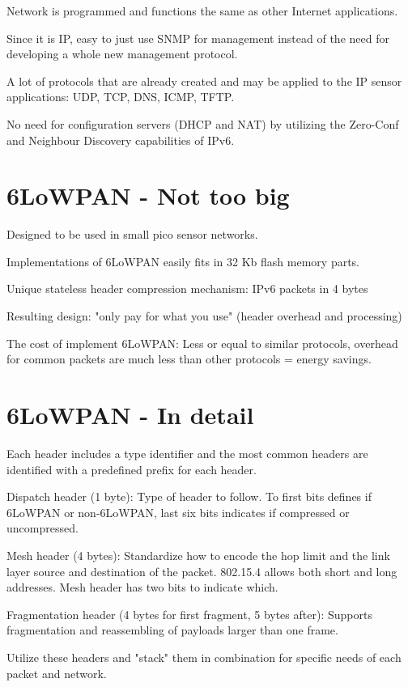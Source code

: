 \documentclass[10pt]{article}
\begin{document}
Network is programmed and functions the same as other Internet applications.


Since it is IP, easy to just use SNMP for management instead of the need for developing a whole new management protocol.

A lot of protocols that are already created and may be applied to the IP sensor applications: UDP, TCP, DNS, ICMP, TFTP.

No need for configuration servers (DHCP and NAT) by utilizing the Zero-Conf and Neighbour Discovery capabilities of IPv6.

\section{6LoWPAN - Not too big}


Designed to be used in small pico sensor networks.

Implementations of 6LoWPAN easily fits in 32 Kb flash memory parts.

Unique stateless header compression mechanism: IPv6 packets in 4 bytes

Resulting design: "only pay for what you use" (header overhead and processing)

The cost of implement 6LoWPAN: Less or equal to similar protocols, overhead for common packets are much less than other protocols = energy savings.


\section{6LoWPAN - In detail}

Each header includes a type identifier and the most common headers are identified with a predefined prefix for each header. 

Dispatch header (1 byte): Type of header to follow. To first bits defines if 6LoWPAN or non-6LoWPAN, last six bits indicates if compressed or uncompressed.

Mesh header (4 bytes): Standardize how to encode the hop limit and the link layer source and destination of the packet. 802.15.4 allows both short and long addresses. Mesh header has two bits to indicate which.

Fragmentation header (4 bytes for first fragment, 5 bytes after): Supports fragmentation and reassembling of payloads larger than one frame.

Utilize these headers and "stack" them in combination for specific needs of each packet and network.
\end{document}
